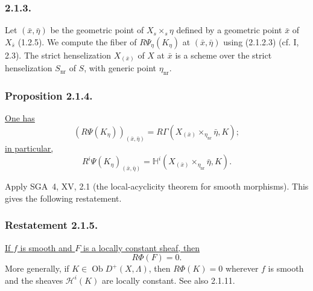 \subsubsection*{2.1.3.}
Let $(\bar x,\bar\eta)$ be the geometric point of
$X_s\times_s\eta$ defined by a geometric point $\bar x$ of
$X_{\bar s}$ (1.2.5).  We compute the fiber of
$R\Psi_\eta(K_\eta)$ at $(\bar x,\bar\eta)$ using (2.1.2.3)
(cf. I, 2.3).  The strict henselization $X_{(\bar x)}$ of $X$ at
$\bar x$ is a scheme over the strict henselization $S_{\mathrm{nr}}$
of $S$, with generic point $\eta_{\mathrm{nr}}$.

\subsubsection*{Proposition 2.1.4.}
\underline{One has}
\begin{equation*}
(R\Psi(K_\eta))_{(\bar x,\bar\eta)}
=R\Gamma\!\left(
X_{(\bar x)}\times_{\eta_{\mathrm{nr}}}\bar\eta,K
\right);
\end{equation*}
\underline{in particular,}
\begin{equation*}
R^i\Psi(K_\eta)_{(\bar x,\bar\eta)}
=\mathbb H^i\!\left(
X_{(\bar x)}\times_{\eta_{\mathrm{nr}}}\bar\eta,K
\right).
\end{equation*}

Apply SGA~4, XV, 2.1 (the local-acyclicity theorem for smooth
morphisms).  This gives the following restatement.

\subsubsection*{Restatement 2.1.5.}
\underline{If $f$ is smooth and $F$ is a locally constant sheaf, then}
\begin{equation*}
R\Phi(F)=0.
\end{equation*}
More generally, if $K\in\operatorname{Ob}D^+(X,\Lambda)$, then
$R\Phi(K)=0$ wherever $f$ is smooth and the sheaves
$\mathcal H^i(K)$ are locally constant.  See also 2.1.11.

